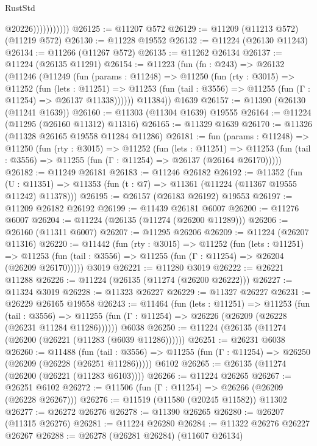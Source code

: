 \begin{lexlean}{RustStd}
\begin{coremodule}
                          @20226)))))))))))
@26125 := @11207 @572
@26129 := @11209 (@11213 @572) (@11219 @572)
@26130 := @11228 @19552
@26132 := @11224 (@26130 @11243)
@26134 := @11266 (@11267 @572)
@26135 := @11262 @26134
@26137 := @11224 (@26135 @11291)
@26154 := @11223
    (fun (fn : @243) =>
    @26132
      (@11246
        (@11249
          (fun (params : @11248) =>
          @11250
            (fun (rty : @3015) =>
            @11252
              (fun (lets : @11251) =>
              @11253 (fun (tail : @3556) => @11255 (fun (Γ : @11254) => @26137 @11338))))))
        @11384))
    @1639
@26157 := @11390 (@26130 (@11241 @1639))
@26160 := @11303 (@11304 @1639) @19555
@26164 := @11224 (@11295 (@26160 @11312) @11316)
@26165 := @11329 @1639
@26170 := @11326 (@11328 @26165 @19558 @11284 @11286)
@26181 := fun (params : @11248) =>
  @11250
    (fun (rty : @3015) =>
    @11252
      (fun (lets : @11251) =>
      @11253 (fun (tail : @3556) => @11255 (fun (Γ : @11254) => @26137 (@26164 @26170)))))
@26182 := @11249 @26181
@26183 := @11246 @26182
@26192 := @11352
    (fun (U : @11351) => @11353 (fun (t : @7) => @11361 (@11224 (@11367 @19555 @11242) @11378)))
@26195 := @26157 (@26183 @26192) @19553
@26197 := @11209 @26182 @26192
@26199 := @11439 @26181 @6007
@26200 := @11276 @6007
@26204 := @11224 (@26135 (@11274 (@26200 @11289)))
@26206 := @26160 (@11311 @6007)
@26207 := @11295 @26206
@26209 := @11224 (@26207 @11316)
@26220 := @11442
    (fun (rty : @3015) =>
    @11252
      (fun (lets : @11251) =>
      @11253 (fun (tail : @3556) => @11255 (fun (Γ : @11254) => @26204 (@26209 @26170)))))
    @3019
@26221 := @11280 @3019
@26222 := @26221 @11288
@26226 := @11224 (@26135 (@11274 (@26200 @26222)))
@26227 := @11324 @3019
@26228 := @11323 @26227
@26229 := @11327 @26227
@26231 := @26229 @26165 @19558
@26243 := @11464
    (fun (lets : @11251) =>
    @11253
      (fun (tail : @3556) =>
      @11255 (fun (Γ : @11254) => @26226 (@26209 (@26228 (@26231 @11284 @11286))))))
    @6038
@26250 := @11224 (@26135 (@11274 (@26200 (@26221 (@11283 (@6039 @11286))))))
@26251 := @26231 @6038
@26260 := @11488
    (fun (tail : @3556) => @11255 (fun (Γ : @11254) => @26250 (@26209 (@26228 (@26251 @11286)))))
    @6102
@26265 := @26135 (@11274 (@26200 (@26221 (@11283 @6103))))
@26266 := @11224 @26265
@26267 := @26251 @6102
@26272 := @11506 (fun (Γ : @11254) => @26266 (@26209 (@26228 @26267)))
@26276 := @11519 (@11580 (@20245 @11582)) @11302
@26277 := @26272 @26276
@26278 := @11390 @26265
@26280 := @26207 (@11315 @26276)
@26281 := @11224 @26280
@26284 := @11322 @26276 @26227 @26267
@26288 := @26278 (@26281 @26284) (@11607 @26134)

\end{coremodule}
\end{lexlean}
